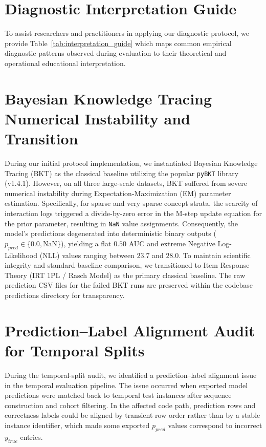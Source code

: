 

\clearpage
\twocolumn

\section{Diagnostic Interpretation Guide}
\label{app:interpretation}
To assist researchers and practitioners in applying our diagnostic protocol, we provide Table~\ref{tab:interpretation_guide} which maps common empirical diagnostic patterns observed during evaluation to their theoretical and operational educational interpretation.



\section{Bayesian Knowledge Tracing Numerical Instability and Transition}
\label{app:bkt_instability}
During our initial protocol implementation, we instantiated Bayesian Knowledge Tracing (BKT) as the classical baseline utilizing the popular \texttt{pyBKT} library (v1.4.1). However, on all three large-scale datasets, BKT suffered from severe numerical instability during Expectation-Maximization (EM) parameter estimation. Specifically, for sparse and very sparse concept strata, the scarcity of interaction logs triggered a divide-by-zero error in the M-step update equation for the prior parameter, resulting in \texttt{NaN} value assignments. Consequently, the model's predictions degenerated into deterministic binary outputs ($p_{pred} \in \{0.0, \text{NaN}\}$), yielding a flat $0.50$ AUC and extreme Negative Log-Likelihood (NLL) values ranging between $23.7$ and $28.0$. To maintain scientific integrity and standard baseline comparison, we transitioned to Item Response Theory (IRT 1PL / Rasch Model) as the primary classical baseline. The raw prediction CSV files for the failed BKT runs are preserved within the codebase predictions directory for transparency.

\section{Prediction--Label Alignment Audit for Temporal Splits}
\label{app:alignment}
During the temporal-split audit, we identified a prediction--label alignment issue in the temporal evaluation pipeline. The issue occurred when exported model predictions were matched back to temporal test instances after sequence construction and cohort filtering. In the affected code path, prediction rows and correctness labels could be aligned by transient row order rather than by a stable instance identifier, which made some exported $p_{pred}$ values correspond to incorrect $y_{true}$ entries.

